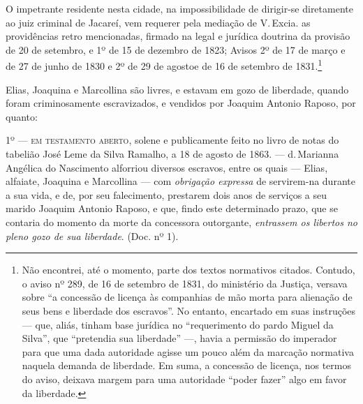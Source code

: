 O impetrante residente nesta cidade, na impossibilidade de dirigir-se
diretamente ao juiz criminal de Jacareí, vem requerer pela mediação de
V.\,Excia. as providências retro mencionadas, firmado na legal e jurídica
doutrina da provisão de 20 de setembro, e 1º de 15 de dezembro de 1823;
Avisos 2º de 17 de março e de 27 de junho de 1830 e 2º de 29 de agostoe
de 16 de setembro de 1831.\footnote{ Não encontrei, até o momento,
  parte dos textos normativos citados. Contudo, o aviso nº 289, de
  16 de setembro de 1831, do ministério da Justiça, versava sobre ``a concessão de
  licença às companhias de mão morta para alienação de seus bens e
  liberdade dos escravos''. No entanto, encartado em suas instruções ---
  que, aliás, tinham base jurídica no ``requerimento do pardo Miguel da
  Silva'', que ``pretendia sua liberdade'' ---, havia a permissão do
  imperador para que uma dada autoridade agisse um pouco além da
  marcação normativa naquela demanda de liberdade. Em suma, a concessão
  de licença, nos termos do aviso, deixava margem para uma autoridade
  ``poder fazer'' algo em favor da liberdade.}

Elias, Joaquina e Marcollina são livres, e estavam em gozo de liberdade,
quando foram criminosamente escravizados, e vendidos por Joaquim Antonio
Raposo, por quanto:

1º --- \textsc{em testamento aberto}, solene e publicamente feito no livro de
notas do tabelião José Leme da Silva Ramalho, a 18 de agosto de 1863. ---
d.\,Marianna Angélica do Nascimento alforriou diversos escravos, entre os
quais --- Elias, alfaiate, Joaquina e Marcollina --- com \emph{obrigação
expressa} de servirem-na durante a sua vida, e de, por seu falecimento,
prestarem dois anos de serviços a seu marido Joaquim Antonio Raposo, e
que, findo este determinado prazo, que se contaria do momento da morte
da concessora outorgante, \emph{entrassem os libertos no pleno gozo de
sua liberdade}. (Doc. nº 1).

